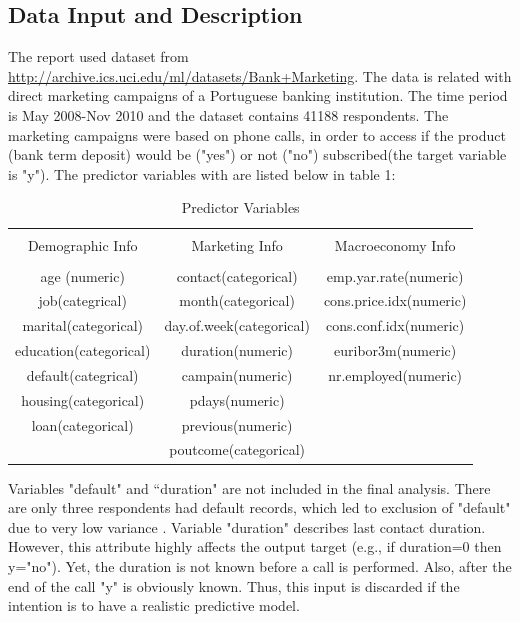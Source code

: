     \subsection{Data Input and Description}
    \noindent The report used dataset from \url{http://archive.ics.uci.edu/ml/datasets/Bank+Marketing}. The data is related with direct marketing campaigns of a Portuguese banking institution. The time period is May 2008-Nov 2010 and the dataset contains 41188 respondents. The marketing campaigns were based on phone calls, in order to access if the product (bank term deposit) would be ("yes") or not ("no") subscribed(the target variable is "y"). The predictor variables with  are listed below in table 1:\\
    \begin{center}
	\begin{table}[!hbp] \centering \label{}  
		\begin{tabular}{ccc} 
			\hline\hline \\[-1.8ex] 
			{Demographic Info}  & {Marketing Info} & {Macroeconomy Info} 
			\\ 
			\hline \\[-1.8ex] 
			age (numeric) & contact(categorical) & emp.yar.rate(numeric)
			\\ 
			job(categrical) & month(categorical) & cons.price.idx(numeric)
			\\ 
			marital(categorical) & day.of.week(categorical) & cons.conf.idx(numeric)
			\\ 
			education(categorical) & duration(numeric) & euribor3m(numeric)
			\\ 
			default(categrical) & campain(numeric) & nr.employed(numeric)
			\\ 
			housing(categorical) & pdays(numeric)
			\\ 
			loan(categorical) & previous(numeric) 
			\\ 
			 & poutcome(categorical) 
			\\ 
			\hline\hline 
		\end{tabular} 
		\caption{Predictor Variables}
    	\end{table}
        \end{center}
        Variables "default" and “duration" are not included in the final analysis. There are only three respondents had default records, which led to exclusion of "default" due to very low variance \citep{max2016applied}. Variable "duration" describes last contact duration. However, this attribute highly affects the output target (e.g., if duration=0 then y="no"). Yet, the duration is not known before a call is performed. Also, after the end of the call "y" is obviously known. Thus, this input is discarded if the intention is to have a realistic predictive model.\\               
